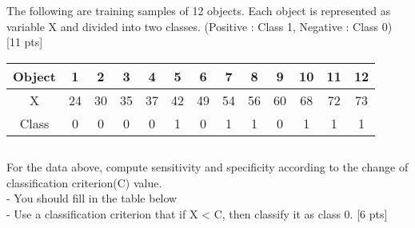 \documentclass{homework}
\begin{document}
    \vspace{10mm}

    \exercise*
    The following are training samples of 12 objects. Each object is represented as variable X and divided into two classes. (Positive : Class 1, Negative : Class 0) [11 pts]
    
    \begin{table}[!h]
    \begin{center}
    \begin{tabular}{|c|cccccccccccc|}
    \hline
    Object & 1  & 2  & 3  & 4  & 5  & 6  & 7  & 8  & 9  & 10 & 11 & 12 \\ \hline
    X      & 24 & 30 & 35 & 37 & 42 & 49 & 54 & 56 & 60 & 68 & 72 & 73 \\
    Class  & 0  & 0  & 0  & 0 &  1  & 0  & 1  & 1  & 0  & 1  & 1  & 1  \\ \hline
    \end{tabular}
    \end{center}
    \end{table}
  
    \subsection{}
    For the data above, compute sensitivity and specificity according to the change of classification criterion(C) value.\\
    - You should fill in the table below \\
    - Use a classification criterion that if X < C, then classify it as class 0. [6 pts]
\end{document}
